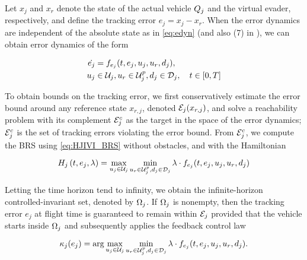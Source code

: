 
Let $x_j$ and $x_r$ denote the state of the actual vehicle $Q_j$ and the virtual evader, respectively, and define the tracking error $e_j=x_j-x_r$. When the error dynamics are independent of the absolute state as in \eqref{eq:edyn} (and also (7) in \cite{Mitchell05}), we can obtain error dynamics of the form

\vspace{-0.1in}
\begin{equation}
\label{eq:edyn} %
\begin{aligned}
\dot{e_j} &= f_{e_j}(t, e_j, u_j, u_r,d_j), \\
u_j &\in \cset_j, u_r\in\cset^p_j, d_j \in \dset_j, \quad t \in [0, T]
\end{aligned}
\end{equation}

To obtain bounds on the tracking error, we first conservatively estimate the error bound around any reference state $x_{r,j}$, denoted $\mathcal{E}_j(x_{r,j})$, and solve a reachability problem with its complement $\mathcal{E}_j^c$ as the target in the space of the error dynamics; $\mathcal{E}_j^c$ is the set of tracking errors violating the error bound. From $\mathcal{E}_j^c$, we compute the BRS using \eqref{eq:HJIVI_BRS} without obstacles, and with the Hamiltonian

\begin{equation}
\label{eq:HJIVI_track}
H_j\left(t, e_j, \lambda\right) = \max_{u_j \in \cset_j} \min_{u_r \in\cset^p_j, d_j \in \dset_j} \lambda \cdot f_{e_j}(t, e_j, u_j, u_r,d_j)
\end{equation}

Letting the time horizon tend to infinity, we obtain the infinite-horizon controlled-invariant set, denoted by $\Omega_j$. If $\Omega_j$ is nonempty, then the tracking error $e_j$ at flight time is guaranteed to remain within $\mathcal{E}_j$ provided that the vehicle starts inside $\Omega_j$ and subsequently applies the feedback control law

\vspace{-1.5em}
\begin{equation}
\label{eq:robust_tracking_law}
\tracklaw_j(e_j) = \arg\max_{u_j \in \cset_j} \min_{u_r \in\cset^p_j, d_j \in \dset_j} \lambda \cdot f_{e_j}(t,e_j,u_j,u_r,d_j).
\end{equation}

